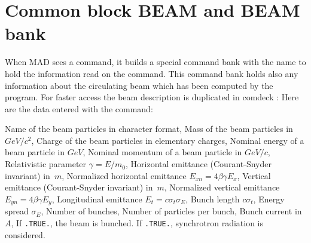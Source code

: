 \section{Common block BEAM and BEAM bank}
\label{Sbdata}
When MAD sees a  command,
it builds a special command bank with the name 
to hold the information read on the  command.
This command bank holds also any information about the
circulating beam which has been computed by the program.
For faster access the beam description is duplicated in comdeck
:
Here are the data entered with the  command:
\begin{mylist}
Name of the beam particles in character format,
Mass of the beam particles in $GeV /c^2$,
Charge of the beam particles in elementary charges,
Nominal energy of a beam particle in $GeV$,
Nominal momentum of a beam particle in $GeV/c$,
Relativistic parameter $\gamma = E / m_0$,
Horizontal emittance (Courant-Snyder invariant) in~$m$,
Normalized horizontal emittance $E_{xn} = 4 \beta \gamma E_x$,
Vertical emittance (Courant-Snyder invariant) in~$m$,
Normalized vertical emittance $E_{yn} = 4 \beta \gamma E_y$,
Longitudinal emittance $E_t = c \sigma_t \sigma_E$,
Bunch length $c \sigma_t$,
Energy spread $\sigma_E$,
Number of bunches,
Number of particles per bunch,
Bunch current in~$A$,
If {\tt .TRUE.}, the beam is bunched.
If {\tt .TRUE.}, synchrotron radiation is considered.
\end{mylist}
